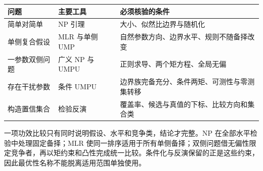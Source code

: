 \begin{center}
\small
\begin{tabularx}{\textwidth}{@{}p{}XX@{}}
\toprule
问题 & 主要工具 & 必须核验的条件\\
\midrule
简单对简单 & NP 引理 & 大小、似然比边界与随机化\\
单侧复合假设 & MLR 与单侧 UMP & 自然参数方向、边界水平、规则不随备择改变\\
一参数双侧问题 & 广义 NP 与 UMPU & 正则求导、两个矩方程、全局无偏\\
存在干扰参数 & 条件 UMPU & 边界族完备充分、条件两矩、可测性与零测集转移\\
构造置信集合 & 检验反演 & 覆盖率、候选与真值的下标、比较方向和集合类\\
\bottomrule
\end{tabularx}
\end{center}

一项功效比较只有同时说明假设、水平和竞争类，结论才完整。NP 在全部水平检验中处理固定备择；MLR 使同一排序适用于所有单侧备择；双侧问题借无偏性限定竞争者，再以矩约束和凸性完成统一比较。条件化与反演保留的正是这些约束，因此最优性名称不能脱离适用范围单独使用。
